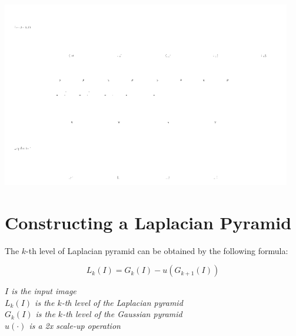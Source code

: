 \documentclass{article}
\begin{document}
\begin{center}
\includegraphics[width=0.95\textwidth]{images/pyramids.png}
\end{center}

\newpage

\section*{Constructing a Laplacian Pyramid}

The $k$-th level of Laplacian pyramid can be obtained by the following formula:

\begin{equation*}
    L_k(I) = G_k(I) - u(G_{k+1}(I))
\end{equation*}

\begin{center}
    \textit{$I$ is the input image} \\
    \textit{$L_k(I)$ is the $k$-th level of the Laplacian pyramid} \\
    \textit{$G_k(I)$ is the $k$-th level of the Gaussian pyramid} \\
    \textit{$u(\cdot)$ is a 2x scale-up operation}
\end{center}
\end{document}
